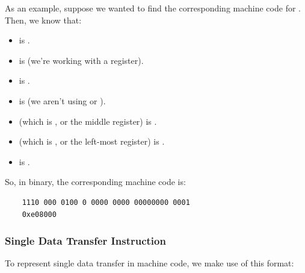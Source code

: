 \documentclass[letterpaper]{article}
\begin{document}
As an example, suppose we wanted to find the corresponding machine code for . Then, we know that:
\begin{itemize}
    \item {} is .
    \item {} is  (we're working with a register). 
    \item {} is . 
    \item {} is  (we aren't using  or ). 
    \item {} (which is , or the middle register) is . 
    \item {} (which is , or the left-most register) is . 
    \item {} is . 
\end{itemize}
So, in binary, the corresponding machine code is:
\begin{verbatim}
    1110 000 0100 0 0000 0000 00000000 0001
    0xe08000
\end{verbatim}

\subsubsection{Single Data Transfer Instruction}
To represent single data transfer in machine code, we make use of this format: 
\end{document}
